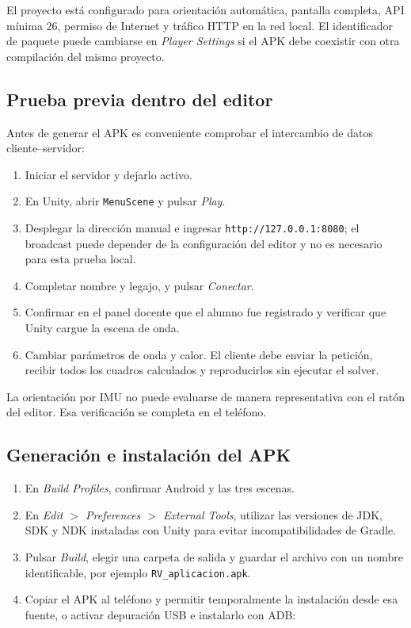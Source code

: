El proyecto está configurado para orientación automática, pantalla completa, API
mínima 26, permiso de Internet y tráfico HTTP en la red local. El identificador de
paquete puede cambiarse en \textit{Player Settings} si el APK debe coexistir con otra
compilación del mismo proyecto.

\subsection{Prueba previa dentro del editor}

Antes de generar el APK es conveniente comprobar el intercambio de datos
cliente--servidor:

\begin{enumerate}
    \item Iniciar el servidor y dejarlo activo.
    \item En Unity, abrir \texttt{MenuScene} y pulsar \textit{Play}.
    \item Desplegar la dirección manual e ingresar
    \texttt{http://127.0.0.1:8080}; el broadcast puede depender de la configuración
    del editor y no es necesario para esta prueba local.
    \item Completar nombre y legajo, y pulsar \textit{Conectar}.
    \item Confirmar en el panel docente que el alumno fue registrado y verificar que
    Unity cargue la escena de onda.
    \item Cambiar parámetros de onda y calor. El cliente debe enviar la petición,
    recibir todos los cuadros calculados y reproducirlos sin ejecutar el solver.
\end{enumerate}

La orientación por IMU no puede evaluarse de manera representativa con el ratón del
editor. Esa verificación se completa en el teléfono.

\subsection{Generación e instalación del APK}
\label{sec:compilar-apk}

\begin{enumerate}
    \item En \textit{Build Profiles}, confirmar Android y las tres escenas.
    \item En \textit{Edit $>$ Preferences $>$ External Tools}, utilizar las versiones
    de JDK, SDK y NDK instaladas con Unity para evitar incompatibilidades de Gradle.
    \item Pulsar \textit{Build}, elegir una carpeta de salida y guardar el archivo con
    un nombre identificable, por ejemplo \texttt{RV\_aplicacion.apk}.
    \item Copiar el APK al teléfono y permitir temporalmente la instalación desde esa
    fuente, o activar depuración USB e instalarlo con ADB:
\end{enumerate}

